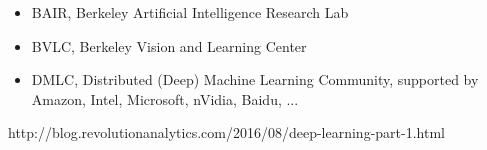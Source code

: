 \begin{frame}
\vskip -10pt
{\scriptsize
\begin{itemize}\setlength\itemsep{0.5em}
\item BAIR, Berkeley Artificial Intelligence Research Lab 
\item BVLC, Berkeley Vision and Learning Center
\item DMLC, Distributed (Deep) Machine Learning Community, supported by Amazon, Intel, Microsoft, nVidia, Baidu, ...
\end{itemize}
}

\begin{center}
{\color{red}\scriptsize
http://blog.revolutionanalytics.com/2016/08/deep-learning-part-1.html
}
\end{center}

\end{frame}


